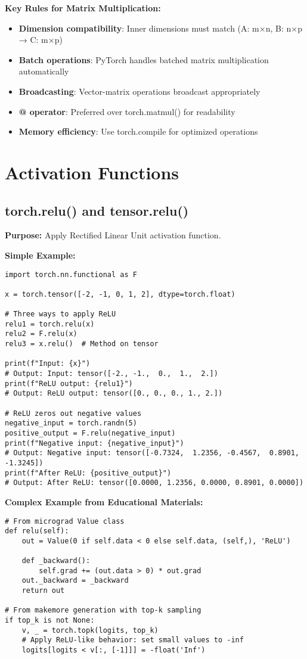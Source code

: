 \documentclass[11pt,a4paper]{book}
\begin{document}
\textbf{Key Rules for Matrix Multiplication:}
\begin{itemize}
    \item \textbf{Dimension compatibility}: Inner dimensions must match (A: m×n, B: n×p → C: m×p)
    \item \textbf{Batch operations}: PyTorch handles batched matrix multiplication automatically
    \item \textbf{Broadcasting}: Vector-matrix operations broadcast appropriately
    \item \textbf{@ operator}: Preferred over torch.matmul() for readability
    \item \textbf{Memory efficiency}: Use torch.compile for optimized operations
\end{itemize}

\section{Activation Functions}

\subsection{torch.relu() and tensor.relu()}

\textbf{Purpose:} Apply Rectified Linear Unit activation function.

\textbf{Simple Example:}
\begin{verbatim}
import torch.nn.functional as F

x = torch.tensor([-2, -1, 0, 1, 2], dtype=torch.float)

# Three ways to apply ReLU
relu1 = torch.relu(x)
relu2 = F.relu(x)
relu3 = x.relu()  # Method on tensor

print(f"Input: {x}")
# Output: Input: tensor([-2., -1.,  0.,  1.,  2.])
print(f"ReLU output: {relu1}")
# Output: ReLU output: tensor([0., 0., 0., 1., 2.])

# ReLU zeros out negative values
negative_input = torch.randn(5)
positive_output = F.relu(negative_input)
print(f"Negative input: {negative_input}")
# Output: Negative input: tensor([-0.7324,  1.2356, -0.4567,  0.8901, -1.3245])
print(f"After ReLU: {positive_output}")
# Output: After ReLU: tensor([0.0000, 1.2356, 0.0000, 0.8901, 0.0000])
\end{verbatim}

\textbf{Complex Example from Educational Materials:}
\begin{verbatim}
# From micrograd Value class
def relu(self):
    out = Value(0 if self.data < 0 else self.data, (self,), 'ReLU')
    
    def _backward():
        self.grad += (out.data > 0) * out.grad
    out._backward = _backward
    return out

# From makemore generation with top-k sampling
if top_k is not None:
    v, _ = torch.topk(logits, top_k)
    # Apply ReLU-like behavior: set small values to -inf
    logits[logits < v[:, [-1]]] = -float('Inf')
\end{verbatim}
\end{document}

